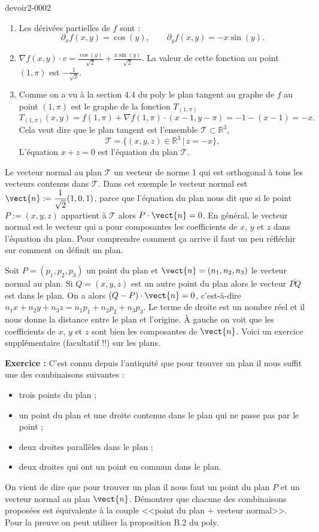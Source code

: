 \begin{corrige}{devoir2-0002}

  \begin{enumerate}
  \item Les dérivées partielles de $f$ sont :
    \[ \partial_x f(x,y)= \cos(y), \qquad \partial_y f (x,y)= -x\sin(y).\]
  \item $\displaystyle \nabla f(x,y)\cdot v= \frac{\cos(y)}{\sqrt{2}}+\frac{x\sin(y)}{\sqrt{2}}.$ La valeur de cette fonction au point $(1,\pi)$  est $-\frac{1}{\sqrt{2}}$.
  \item Comme on a vu à la section 4.4 du poly le plan tangent au graphe de $f$ au point $(1,\pi)$ est le graphe de la fonction $T_{(1,\pi)}$ 
    \[ T_{(1,\pi)}(x,y)= f(1,\pi) + \nabla f(1,\pi)\cdot (x-1, y-\pi)= -1- (x-1)= -x.\]
    Cela veut dire que le plan tangent est l'ensemble $\mathcal{T}\subset\mathbb{R}^3$, 
    \[\mathcal{T}=\{(x,y,z)\in \mathbb{R}^3\, \vert \, z=-x \},\]
    L'équation $x+z=0$ est l'équation du plan $\mathcal{T}$. 
  \end{enumerate}
  Le vecteur normal au plan $\mathcal{T}$ un vecteur de norme 1 qui est orthogonal à tous les vecteurs contenus dans $\mathcal{T}$. Dans cet exemple le vecteur normal est  $\displaystyle \vect{ n }:=\frac{1}{\sqrt{2}}(1,0,1)$, parce que l'équation du plan nous dit que si le point $P:=(x,y,z)$ appartient à $\mathcal{T}$ alors $P\cdot\vect{ n }=0$. 
  En général, le vecteur normal est le vecteur qui a pour composantes les coefficients de $x$, $y$ et $z$ dans l'équation du plan. Pour comprendre comment ça arrive il faut un peu réfléchir sur comment on définit un plan. 

  Soit $P=(p_1, p_2, p_3)$ un point du plan et $\vect{ n }=(n_1, n_2, n_3)$ le vecteur normal au plan. Si $Q= (x,y,z)$ est un autre point du plan alors le vecteur $\bar{PQ}$ est dans le plan. On a alors $(Q-P)\cdot \vect{n}=0$, c'est-à-dire $n_1x+n_2y+n_3z=n_1p_1+n_2p_2+n_3p_3$. Le terme de droite est un nombre réel et il nous donne la distance entre le plan et l'origine. À gauche on voit que les coefficients de $x$, $y$ et $z$ sont bien les composantes de $\vect{n}$.  
  Voici un exercice supplémentaire (facultatif !!) sur les plans.  
    
  \textbf{Exercice :} C'est connu depuis l'antiquité que pour trouver un plan il nous suffit une des combinaisons suivantes :
  \begin{itemize}
  \item trois points du plan ;
  \item un point du plan et une droite contenue dans le plan  qui ne passe pas par le point ;
  \item deux droites parallèles dans le plan ;
  \item deux droites qui ont un point en commun dans le plan.
  \end{itemize}
  On vient de dire que pour trouver un plan il nous faut un point du plan $P$ et un vecteur normal au plan  $\vect{ n }$. Démontrer que chacune des combinaisons proposées est équivalente à la couple <<point du plan $+$ vecteur normal>>. Pour la preuve on peut utiliser la proposition B.2 du poly.    

\end{corrige}
